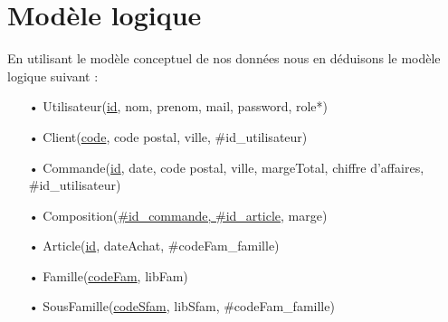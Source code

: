 \section{Modèle logique}

En utilisant le modèle conceptuel de nos données nous en déduisons le modèle logique suivant :
\begin{enumerate}
\item[•] Utilisateur(\underline{id}, nom, prenom, mail, password, role*)
\item[•] Client(\underline{code}, code postal, ville, \#id\_utilisateur)
\item[•] Commande(\underline{id}, date, code postal, ville, margeTotal, chiffre d’affaires, \#id\_utilisateur)
\item[•] Composition(\underline{\#id\_commande, \#id\_article}, marge)
\item[•] Article(\underline{id}, dateAchat, \#codeFam\_famille)
\item[•] Famille(\underline{codeFam}, libFam)
\item[•] SousFamille(\underline{codeSfam}, libSfam, \#codeFam\_famille) \\
\end{enumerate}
